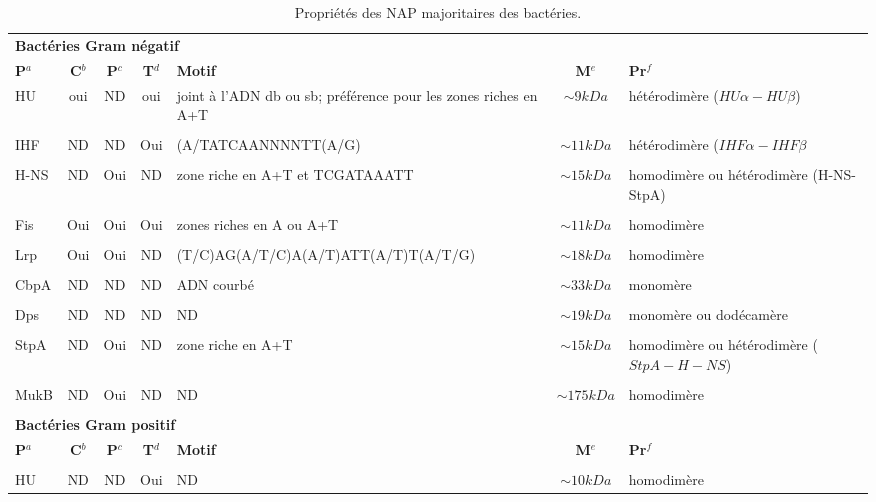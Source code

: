 \begin{table}[H]
	\hspace{-1.5cm}
	\caption[Propriétés des NAP majoritaires des bactéries]{Propriétés des NAP majoritaires des bactéries.}\label{tabnap2}
	\small 
	\begin{tabular}[left]{lcccp{}cp{}}
	\multicolumn{6}{l}{\textbf{Bactéries Gram négatif}}\\
	\textbf{P}$^{a}$ & \textbf{C}$^{b}$ & \textbf{P}$^{c}$ & \textbf{T}$^{d}$ & \textbf{Motif} & \textbf{M}$^{e}$ & \textbf{Pr}$^{f}$\\
	\hline
	HU & oui & ND & oui & joint à l'ADN db ou sb; préférence pour les zones riches en A+T & $\sim9kDa$ & hétérodimère ($HU\alpha-HU\beta$)\\
	\\[-0.2cm]
	IHF & ND & ND & Oui & (A/TATCAANNNNTT(A/G) & $\sim11kDa$ & hétérodimère ($IHF\alpha-IHF\beta$\\
	\\[-0.2cm]
	H-NS & ND & Oui & ND & zone riche en A+T et TCGATAAATT & $\sim15kDa$ & homodimère ou hétérodimère (H-NS-StpA)\\
	\\[-0.2cm]
	Fis & Oui & Oui & Oui & zones riches en A ou A+T & $\sim11kDa$ & homodimère\\
	\\[-0.2cm]
	Lrp & Oui & Oui & ND & (T/C)AG(A/T/C)A(A/T)ATT(A/T)T(A/T/G) & $\sim18kDa$ & homodimère\\
	\\[-0.2cm]
	CbpA & ND & ND & ND & ADN courbé & $\sim33kDa$ & monomère\\
	\\[-0.2cm]
	Dps & ND & ND & ND & ND & $\sim19kDa$ & monomère ou dodécamère\\
	\\[-0.2cm]
	StpA & ND & Oui & ND & zone riche en A+T & $\sim15kDa$ & homodimère ou hétérodimère ($StpA-H-NS$)\\
	\\[-0.2cm]
	MukB & ND & Oui & ND & ND & $\sim175kDa$ & homodimère\\
	\\[-0.4cm]
	\multicolumn{6}{l}{\textbf{Bactéries Gram positif}}\\
	\textbf{P}$^{a}$ & \textbf{C}$^{b}$ & \textbf{P}$^{c}$ & \textbf{T}$^{d}$ & \textbf{Motif} & \textbf{M}$^{e}$ & \textbf{Pr}$^{f}$\\
	\hline
	\\[-0.2cm]
	HU & ND & ND & Oui & ND & $\sim10kDa$ & homodimère\\

\end{tabular}
\end{table}
